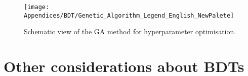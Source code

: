 \begin{figure}[h]
\centering
  \centering
  \texttt{[image: Appendices/BDT/Genetic\_Algorithm\_Legend\_English\_NewPalete]}
\caption{Schematic view of the GA method for hyperparameter optimisation.}
\label{fig:Appendix:BDT:GA_loop}
\end{figure}





\section{Other considerations about BDTs}
\label{chap:Appendix:BDT:Concepts}




